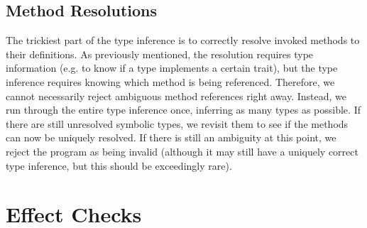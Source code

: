 \subsection{Method Resolutions}
The trickiest part of the type inference is to correctly resolve invoked methods to their definitions. As previously mentioned, the resolution requires type information (e.g. to know if a type implements a certain trait), but the type inference requires knowing which method is being referenced. Therefore, we cannot necessarily reject ambiguous method references right away. Instead, we run through the entire type inference once, inferring as many types as possible. If there are still unresolved symbolic types, we revisit them to see if the methods can now be uniquely resolved. If there is still an ambiguity at this point, we reject the program as being invalid (although it may still have a uniquely correct type inference, but this should be exceedingly rare).

\section{Effect Checks}

